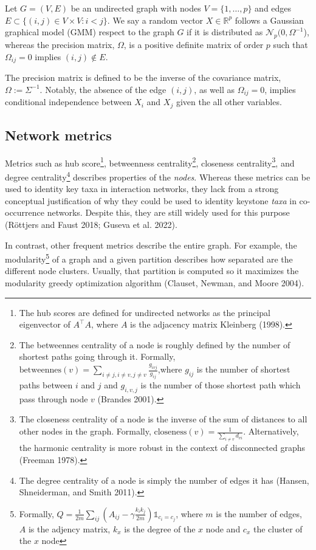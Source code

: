 \documentclass[
]{article}
\begin{document}
Let \(G = (V, E)\) be an undirected graph with nodes
\(V=\{1, \dots, p\}\) and edges
\(E \subset \{(i, j) \in V\times V : i<j\}\). We say a random vector
\(X\in\mathbb R^p\) follows a Gaussian graphical model (GMM) respect to
the graph \(G\) if it is distributed as
\(\mathcal N_p(0, \Omega ^{-1}\)), whereas the precision matrix,
\(\Omega\), is a positive definite matrix of order \(p\) such that
\(\Omega_{ij} = 0\) implies \((i, j) \notin E\).

The precision matrix is defined to be the inverse of the covariance
matrix, \(\Omega :=\Sigma^{-1}\). Notably, the absence of the edge
\((i, j)\), as well as \(\Omega_{ij}=0\), implies conditional
independence between \(X_i\) and \(X_j\) given the all other variables.

\hypertarget{network-metrics}{%
\subsection{Network metrics}\label{network-metrics}}

Metrics such as hub score\footnote{The hub scores are defined for
  undirected networks as the principal eigenvector of \(A^\top A\),
  where \(A\) is the adjacency matrix Kleinberg (1998).}, betweenness
centrality\footnote{The betweennes centrality of a node is roughly
  defined by the number of shortest paths going through it. Formally,
  \(\text{betweennes}(v) = \sum_{i\ne j, i\ne v, j\ne v} \frac{g_{ivj}}{g_{ij}}\),where
  \(g_{ij}\) is the number of shortest paths between \(i\) and \(j\) and
  \(g_{i, v, j}\) is the number of those shortest path which pass
  through node \(v\) (Brandes 2001).}, closeness centrality\footnote{The
  closeness centrality of a node is the inverse of the sum of distances
  to all other nodes in the graph. Formally,
  \(\text{closeness}(v) = \frac{1}{\sum_{i\ne v}d_{vi}}\).
  Alternatively, the harmonic centrality is more robust in the context
  of disconnected graphs (Freeman 1978).}, and degree
centrality\footnote{The degree centrality of a node is simply the number
  of edges it has (Hansen, Shneiderman, and Smith 2011).} describes
properties of the \emph{nodes}. Whereas these metrics can be used to
identity key taxa in interaction networks, they lack from a strong
conceptual justification of why they could be used to identity keystone
\emph{taxa} in co-occurrence networks. Despite this, they are still
widely used for this purpose (Röttjers and Faust 2018; Guseva et al.
2022).

In contrast, other frequent metrics describe the entire graph. For
example, the modularity\footnote{Formally,
  \(Q = \frac{1}{2m}\sum_{ij}\left( A_{ij} - \gamma \frac{k_ik_j}{2m}\right )\mathbb1_{c_i = c_j}\),
  where \(m\) is the number of edges, \(A\) is the adjency matrix,
  \(k_x\) is the degree of the \(x\) node and \(c_x\) the cluster of the
  \(x\) node} of a graph and a given partition describes how separated
are the different node clusters. Usually, that partition is computed so
it maximizes the modularity greedy optimization algorithm (Clauset,
Newman, and Moore 2004).
\end{document}
